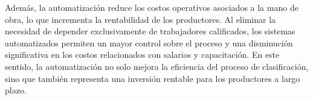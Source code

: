 Además, la automatización reduce los costos operativos asociados a la mano de obra, lo que incrementa la rentabilidad de los productores. Al eliminar la necesidad de depender exclusivamente de trabajadores calificados, los sistemas automatizados permiten un mayor control sobre el proceso y una disminución significativa en los costos relacionados con salarios y capacitación. En este sentido, la automatización no solo mejora la eficiencia del proceso de clasificación, sino que también representa una inversión rentable para los productores a largo plazo.